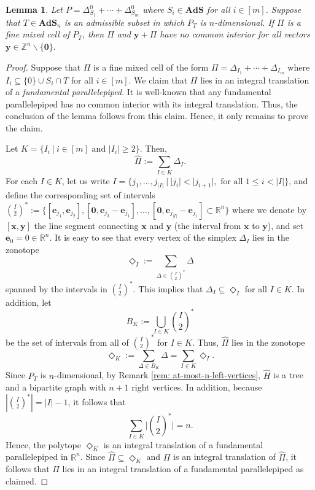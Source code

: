 \documentclass[12pt,reqno]{article}%
\newtheorem{lem}[thm]{Lemma}
\theoremstyle{definition}
\numberwithin{equation}{section}
\newcommand{\bbe}{\mathbf{e}}
\newcommand{\bbx}{\mathbf{x}}
\newcommand{\bby}{\mathbf{y}}
\newcommand{\Z}{\mathbb Z}
\newcommand{\R}{\mathbb R}
\newcommand{\ads}{\mathbf{AdS}}
\begin{document}
\begin{lem}\label{lem: no-common-interior} Let $P = \Delta^0_{S_1} + \cdots + \Delta^0_{S_m}$ where $S_i \in \ads$ for all $i \in [m]$. Suppose that $T \in \ads_n$ is an admissible subset in which $P_T$ is $n$-dimensional. If $\Pi$ is a fine mixed cell of $P_T$, then $\Pi$ and $\bby + \Pi$ have no common interior for all vectors $\bby \in \Z^n\backslash\{\mathbf{0}\}.$
\end{lem} 

\begin{proof}
    Suppose that $\Pi$ is a fine mixed cell of the form $\Pi = \Delta_{I_1} + \cdots + \Delta_{I_m}$ where  $I_i \subseteq \{0\}\cup S_i\cap T$ for all $i \in [m]$. We claim that $\Pi$ lies in an integral translation of a \emph{fundamental parallelepiped}. It is well-known that any fundamental parallelepiped has no common interior with its integral translation. Thus, the conclusion of the lemma follows from this claim. Hence, it only remains to prove the claim.
    
    Let $K = \{I_i\ | \ i \in [m] \text{ and } |I_i| \geq 2\}$. Then, 
    \[\hat{\Pi} := \sum_{I \in K}\Delta_I.\]
    For each $I \in K$, let us write $I= \{j_1, \dots, j_{|I|}\ | \ |j_i| < |j_{i+1}|, \text{ for all } 1 \leq i < |I| \}$, and define the corresponding set of intervals 
    $\binom{I}{2}^* := \{[\bbe_{j_1}, \bbe_{j_2}], [\mathbf{0}, \bbe_{j_3} - \bbe_{j_1}], \dots, [\mathbf{0},\bbe_{j_{|I|}} - \bbe_{j_1}] \subset \R^n\}$
    where we denote by $[\bbx, \bby]$ the line segment connecting $\bbx$ and $\bby$ (the interval from $\bbx$ to $\bby$), and set $\bbe_0 = \mathrm{0} \in \R^n$. It is easy to see that every vertex of the simplex $\Delta_I$ lies in the zonotope
    \[\Diamond_I := \sum_{\Delta \in \binom{I}{2}^*}\Delta\]
    spanned by the intervals in $\binom{I}{2}^*.$ This implies that $\Delta_I \subseteq \Diamond_I$ for all $I \in K$. In addition, let
    \[B_K := \bigcup_{I \in K} \binom{I}{2}^*\]
    be the set of intervals from all of $\binom{I}{2}^*$ for $I \in K$. Thus, $\hat{\Pi}$ lies in the zonotope
    \[\Diamond_K := \sum_{\Delta \in B_K}\Delta = \sum_{I \in K}\Diamond_I.\]
    Since $P_T$ is $n$-dimensional, by Remark \ref{rem: at-most-n-left-vertices}, $\hat{H}$ is a tree and a bipartite graph with $n+1$ right vertices. In addition, because $|\binom{I}{2}^*| = |I|-1$, it follows that $$\sum_{I \in K}\Big|\binom{I}{2}^*\Big| = n.$$ Hence, the polytope $\Diamond_K$ is an integral translation of a fundamental parallelepiped in $\R^n$. Since $\hat{\Pi} \subseteq \Diamond_K$ and $\Pi$ is an integral translation of $\hat{\Pi}$, it follows that $\Pi$ lies in an integral translation of a fundamental parallelepiped as claimed.
\end{proof}
\end{document}
